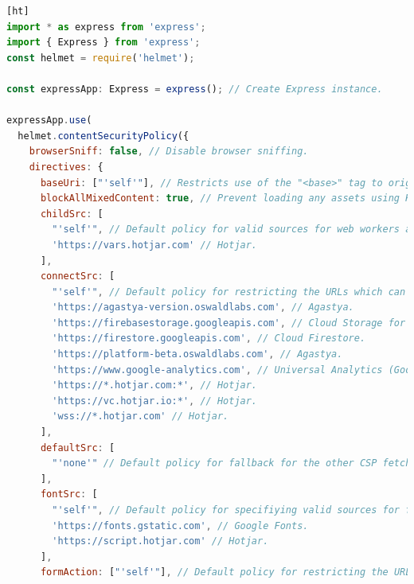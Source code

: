 \documentclass{article} %
\begin{document}
\begin{lstlisting}[language=JavaScript,firstnumber=1,label={lis:csp},caption={CSP for developed application.}][ht]
import * as express from 'express';
import { Express } from 'express';
const helmet = require('helmet');

const expressApp: Express = express(); // Create Express instance.

expressApp.use(
  helmet.contentSecurityPolicy({
    browserSniff: false, // Disable browser sniffing.
    directives: {
      baseUri: ["'self'"], // Restricts use of the "<base>" tag to origin (without subdomains). This directive doesn't use "default-src" as fallback, thus by default it allows anything.
      blockAllMixedContent: true, // Prevent loading any assets using HTTP when the page is loaded using HTTPS.
      childSrc: [
        "'self'", // Default policy for valid sources for web workers and nested browsing contexts loaded using elements such as "<frame>" and "<iframe>": allow all content coming from origin (without subdomains).
        'https://vars.hotjar.com' // Hotjar.
      ],
      connectSrc: [
        "'self'", // Default policy for restricting the URLs which can be loaded using script interfaces: allow all content coming from origin (without subdomains).
        'https://agastya-version.oswaldlabs.com', // Agastya.
        'https://firebasestorage.googleapis.com', // Cloud Storage for Firebase.
        'https://firestore.googleapis.com', // Cloud Firestore.
        'https://platform-beta.oswaldlabs.com', // Agastya.
        'https://www.google-analytics.com', // Universal Analytics (Google Analytics).
        'https://*.hotjar.com:*', // Hotjar.
        'https://vc.hotjar.io:*', // Hotjar.
        'wss://*.hotjar.com' // Hotjar.
      ],
      defaultSrc: [
        "'none'" // Default policy for fallback for the other CSP fetch directives [Link of these: https://developer.mozilla.org/en-US/docs/Web/HTTP/Headers/Content-Security-Policy/default-src]: disallows everything.
      ],
      fontSrc: [
        "'self'", // Default policy for specifiying valid sources for fonts loaded using "@font-face": allow all content coming from origin (without subdomains).
        'https://fonts.gstatic.com', // Google Fonts.
        'https://script.hotjar.com' // Hotjar.
      ],
      formAction: ["'self'"], // Default policy for restricting the URLs which can be used as the target of a form submissions from a given context: allow all content coming from origin (without subdomains). This directive doesn't use "default-src" as fallback, thus by default it allows anything.

\end{lstlisting}
\end{document}
